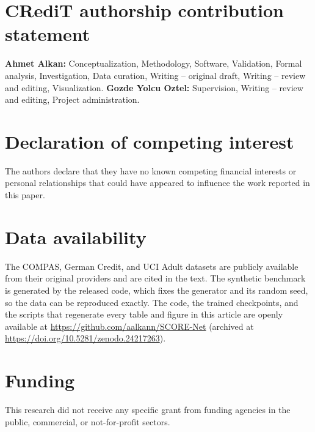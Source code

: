 
\section*{CRediT authorship contribution statement}

\textbf{Ahmet Alkan:} Conceptualization, Methodology, Software, Validation,
Formal analysis, Investigation, Data curation, Writing -- original draft,
Writing -- review and editing, Visualization.
\textbf{Gozde Yolcu Oztel:}  Supervision,
Writing -- review and editing, Project administration.

\section*{Declaration of competing interest}

The authors declare that they have no known competing financial interests or
personal relationships that could have appeared to influence the work reported
in this paper.

\section*{Data availability}

The COMPAS, German Credit, and UCI Adult datasets are publicly available from
their original providers and are cited in the text. The synthetic benchmark is
generated by the released code, which fixes the generator and its random seed,
so the data can be reproduced exactly. The code, the trained checkpoints, and
the scripts that regenerate every table and figure in this article are openly
available at
\mbox{\url{https://github.com/aalkann/SCORE-Net}} (archived at
\mbox{\url{https://doi.org/10.5281/zenodo.24217263}}).

\section*{Funding}

This research did not receive any specific grant from funding agencies in the
public, commercial, or not-for-profit sectors.

